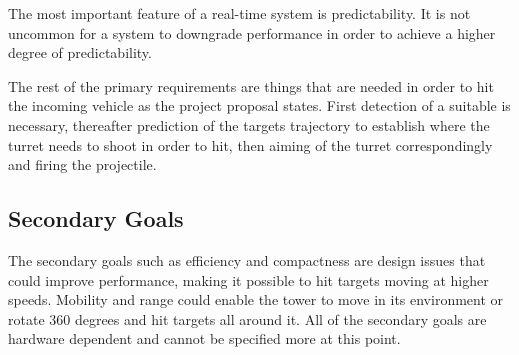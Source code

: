 The most important feature of a real-time system is predictability. It is not uncommon for a system to downgrade performance in order to achieve a higher degree of predictability. 

The rest of the primary requirements are things that are needed in order to hit the incoming vehicle as the project proposal states. First detection of a suitable is necessary, thereafter prediction of the targets trajectory to establish where the turret needs to shoot in order to hit, then aiming of the turret correspondingly and firing the projectile. 

\subsection{Secondary Goals} %
\label{sub:secondary_goals}
The secondary goals such as efficiency and compactness are design issues that could improve performance, making it possible to hit targets moving at higher speeds. Mobility and range could enable the tower to move in its environment or rotate 360 degrees and hit targets all around it. All of the secondary goals are hardware dependent and cannot be specified more at this point.

